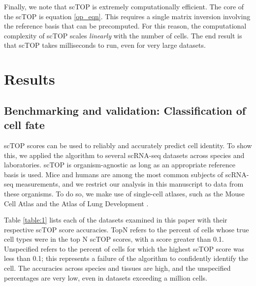 \documentclass[aps,superscriptaddress, notitlepage,longbibliography]{revtex4-1}
\begin{document}
Finally, we note that scTOP is extremely computationally efficient. The core of the scTOP is equation \ref{op_eqn}. This requires a single matrix inversion involving the reference basis that can be precomputed. For this reason, the computational complexity of scTOP scales \emph{linearly} with the number of cells. The end result is that scTOP takes milliseconds to run, even for very large datasets. 
\section{Results}

\subsection{Benchmarking and validation: Classification of cell fate}


scTOP scores can be used to reliably and accurately predict cell identity. To show this, we applied the algorithm to several scRNA-seq datasets across species and laboratories. scTOP is organism-agnostic as long as an appropriate reference basis is used. Mice and humans are among the most common subjects of scRNA-seq measurements, and we restrict our analysis in this manuscript to data from these organisms. To do so, we make use of single-cell atlases, such as the Mouse Cell Atlas \cite{noauthor_mapping_nodate} and the Atlas of Lung Development \cite{negretti_single-cell_2021}.


Table \ref{table:1} lists each of the datasets examined in this paper with their respective scTOP score accuracies. TopN refers to the percent of cells whose true cell types were in the top N scTOP scores, with a score greater than 0.1. Unspecified refers to the percent of cells for which the highest scTOP score was less than 0.1; this represents a failure of the algorithm to confidently identify the cell. The accuracies across species and tissues are high, and the unspecified percentages are very low, even in datasets exceeding a million cells.
\end{document}

